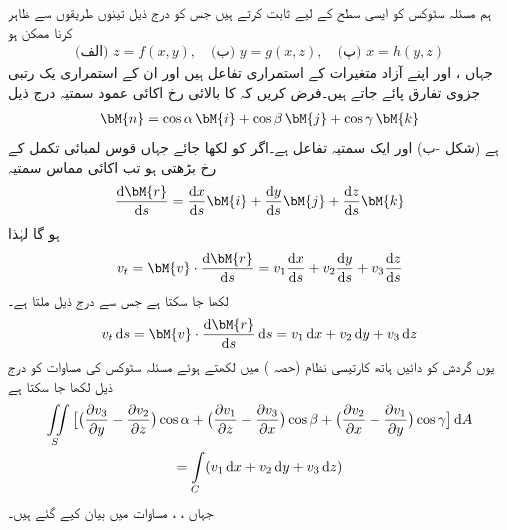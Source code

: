 ہم مسئلہ سٹوکس کو ایسی سطح  کے لیے ثابت کرتے ہیں جس کو درج ذیل تینوں طریقوں سے ظاہر کرنا ممکن ہو
\begin{align}\label{مساوات_خطی_تکمل_سٹوکس_ب}
\text{(الف)}\,\,z=f(x,y),\quad \text{(ب)}\,\,y=g(x,z),\quad \text{(پ)}\,\,x=h(y,z)
\end{align}
جہاں ،  اور  اپنے آزاد متغیرات کے استمراری تفاعل ہیں اور ان کے استمراری یک رتبی جزوی تفارق پائے جاتے ہیں۔فرض کریں کہ  کا بالائی رخ اکائی عمود سمتیہ  درج ذیل
\begin{align}\label{مساوات_خطی_تکمل_سٹوکس_پ}
\bM{n}=\cos \alpha \,\bM{i}+\cos \beta \,\bM{j}+\cos \gamma \,\bM{k}
\end{align}
ہے (شکل -ب) اور  ایک سمتیہ  تفاعل ہے۔اگر  کو  لکھا جائے جہاں قوس لمبائی  تکمل کے رخ بڑھتی ہو تب اکائی مماس سمتیہ
\begin{align*}
\frac{\dif \bM{r}}{\dif s}=\frac{\dif x}{\dif s}\bM{i}+\frac{\dif y}{\dif s}\bM{j}+\frac{\dif z}{\dif s}\bM{k}
\end{align*}
ہو گا لہٰذا
\begin{align*}
v_t=\bM{v}\cdot \frac{\dif \bM{r}}{\dif s}=v_1\frac{\dif x}{\dif s}+v_2\frac{\dif y}{\dif s}+v_3\frac{\dif z}{\dif s}
\end{align*}
لکھا جا سکتا ہے جس سے درج ذیل ملتا ہے۔
\begin{align*}
v_t \dif s=\bM{v}\cdot \frac{\dif \bM{r}}{\dif s}\dif s=v_1\dif x+v_2\dif y+v_3\dif z
\end{align*}
یوں  گردش کو دائیں ہاتھ کارتیسی نظام (حصہ ) میں لکھتے ہوئے مسئلہ سٹوکس کی مساوات کو درج ذیل لکھا جا سکتا ہے
\begin{multline}\label{مساوات_خطی_تکمل_سٹوکس_ت}
\iint\limits_S\big[\big(\frac{\partial v_3}{\partial y}-\frac{\partial v_2}{\partial z}\big)\cos \alpha+\big(\frac{\partial v_1}{\partial z}-\frac{\partial v_3}{\partial x}\big)\cos \beta+\big(\frac{\partial v_2}{\partial x}-\frac{\partial v_1}{\partial y}\big)\cos \gamma\big]\dif A\\
=\int\limits_C (v_1\dif x+v_2\dif y+v_3\dif z)
\end{multline} 
جہاں ، ،  مساوات  میں بیان کیے گئے ہیں۔

